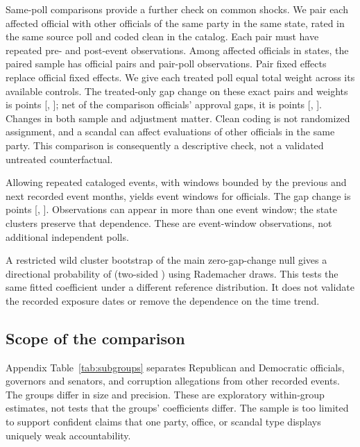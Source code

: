 \documentclass[11pt]{article}
\begin{document}
Same-poll comparisons provide a further check on common shocks. We pair each affected official with other officials of the same party in the same state, rated in the same source poll and coded clean in the catalog. Each pair must have repeated pre- and post-event observations. Among \PairedPoliticians{} affected officials in \PairedStates{} states, the paired sample has \PairedUnits{} official pairs and \PairedN{} pair-poll observations. Pair fixed effects replace official fixed effects. We give each treated poll equal total weight across its available controls. The treated-only gap change on these exact pairs and weights is \TreatedEstimate{} points [\TreatedLower, \TreatedUpper]; net of the comparison officials' approval gaps, it is \PairedEstimate{} points [\PairedLower, \PairedUpper]. Changes in both sample and adjustment matter. Clean coding is not randomized assignment, and a scandal can affect evaluations of other officials in the same party. This comparison is consequently a descriptive check, not a validated untreated counterfactual.

Allowing repeated cataloged events, with windows bounded by the previous and next recorded event months, yields \RepeatedUnits{} event windows for \RepeatedPoliticians{} officials. The gap change is \RepeatedEstimate{} points [\RepeatedLower, \RepeatedUpper]. Observations can appear in more than one event window; the state clusters preserve that dependence. These are event-window observations, not additional independent polls.

A restricted wild cluster bootstrap of the main zero-gap-change null gives a directional probability of \BootstrapDirectionalP{} (two-sided \BootstrapP) using \BootstrapDraws{} Rademacher draws. This tests the same fitted coefficient under a different reference distribution. It does not validate the recorded exposure dates or remove the dependence on the time trend.

\subsection{Scope of the comparison}

Appendix Table~\ref{tab:subgroups} separates Republican and Democratic officials, governors and senators, and corruption allegations from other recorded events. The groups differ in size and precision. These are exploratory within-group estimates, not tests that the groups' coefficients differ. The sample is too limited to support confident claims that one party, office, or scandal type displays uniquely weak accountability.
\end{document}
